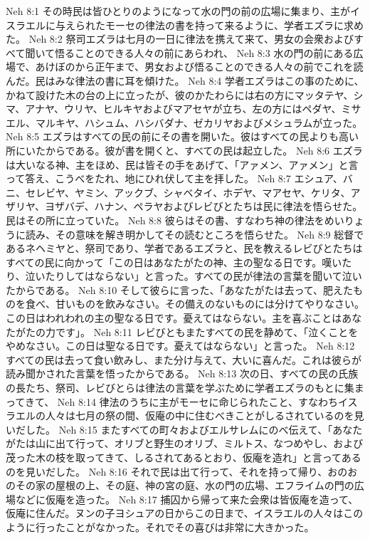 Neh 8:1  その時民は皆ひとりのようになって水の門の前の広場に集まり、主がイスラエルに与えられたモーセの律法の書を持って来るように、学者エズラに求めた。
Neh 8:2  祭司エズラは七月の一日に律法を携えて来て、男女の会衆およびすべて聞いて悟ることのできる人々の前にあらわれ、
Neh 8:3  水の門の前にある広場で、あけぼのから正午まで、男女および悟ることのできる人々の前でこれを読んだ。民はみな律法の書に耳を傾けた。
Neh 8:4  学者エズラはこの事のために、かねて設けた木の台の上に立ったが、彼のかたわらには右の方にマッタテヤ、シマ、アナヤ、ウリヤ、ヒルキヤおよびマアセヤが立ち、左の方にはペダヤ、ミサエル、マルキヤ、ハシュム、ハシバダナ、ゼカリヤおよびメシュラムが立った。
Neh 8:5  エズラはすべての民の前にその書を開いた。彼はすべての民よりも高い所にいたからである。彼が書を開くと、すべての民は起立した。
Neh 8:6  エズラは大いなる神、主をほめ、民は皆その手をあげて、「アァメン、アァメン」と言って答え、こうべをたれ、地にひれ伏して主を拝した。
Neh 8:7  エシュア、バニ、セレビヤ、ヤミン、アックブ、シャベタイ、ホデヤ、マアセヤ、ケリタ、アザリヤ、ヨザバデ、ハナン、ペラヤおよびレビびとたちは民に律法を悟らせた。民はその所に立っていた。
Neh 8:8  彼らはその書、すなわち神の律法をめいりょうに読み、その意味を解き明かしてその読むところを悟らせた。
Neh 8:9  総督であるネヘミヤと、祭司であり、学者であるエズラと、民を教えるレビびとたちはすべての民に向かって「この日はあなたがたの神、主の聖なる日です。嘆いたり、泣いたりしてはならない」と言った。すべての民が律法の言葉を聞いて泣いたからである。
Neh 8:10  そして彼らに言った、「あなたがたは去って、肥えたものを食べ、甘いものを飲みなさい。その備えのないものには分けてやりなさい。この日はわれわれの主の聖なる日です。憂えてはならない。主を喜ぶことはあなたがたの力です」。
Neh 8:11  レビびともまたすべての民を静めて、「泣くことをやめなさい。この日は聖なる日です。憂えてはならない」と言った。
Neh 8:12  すべての民は去って食い飲みし、また分け与えて、大いに喜んだ。これは彼らが読み聞かされた言葉を悟ったからである。
Neh 8:13  次の日、すべての民の氏族の長たち、祭司、レビびとらは律法の言葉を学ぶために学者エズラのもとに集まってきて、
Neh 8:14  律法のうちに主がモーセに命じられたこと、すなわちイスラエルの人々は七月の祭の間、仮庵の中に住むべきことがしるされているのを見いだした。
Neh 8:15  またすべての町々およびエルサレムにのべ伝えて、「あなたがたは山に出て行って、オリブと野生のオリブ、ミルトス、なつめやし、および茂った木の枝を取ってきて、しるされてあるとおり、仮庵を造れ」と言ってあるのを見いだした。
Neh 8:16  それで民は出て行って、それを持って帰り、おのおのその家の屋根の上、その庭、神の宮の庭、水の門の広場、エフライムの門の広場などに仮庵を造った。
Neh 8:17  捕囚から帰って来た会衆は皆仮庵を造って、仮庵に住んだ。ヌンの子ヨシュアの日からこの日まで、イスラエルの人々はこのように行ったことがなかった。それでその喜びは非常に大きかった。
